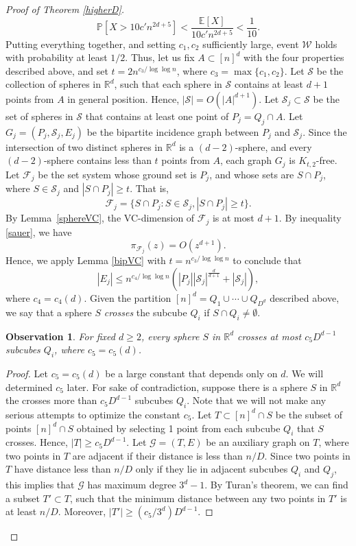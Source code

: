 \documentclass[11pt]{article}
\theoremstyle{plain}
\newtheorem{observation}[theorem]{Observation}
\theoremstyle{definition}
\theoremstyle{remark}
\begin{document}
\begin{proof}[Proof of Theorem \ref{higherD}]
%
%
$$\mathbb{P}[X> 10c'n^{2d + 5}] < \frac{\mathbb{E}[X]}{10c'n^{2d + 5}} < \frac{1}{10}.$$
%
 \noindent Putting everything together, and setting $c_1, c_2$ sufficiently large, event $\mathcal{W}$ holds with probability at least $1/2$.  
%
%
%
%
%
%
 Thus, let us fix $A\subset [n]^d$ with the four properties described above, and set $t = 2n^{c_3/\log\log n}$, where $c_3 = \max\{c_1,c_2\}$.  Let $\mathcal{S}$ be the collection of spheres in $\mathbb{R}^d$, such that each sphere in $\mathcal{S}$ contains at least $d+1$ points from $A$ in general position.  Hence, $|\mathcal{S}| = O(|A|^{d + 1})$. Let $\mathcal{S}_j \subset \mathcal{S}$ be the set of spheres in $\mathcal{S}$ that contains at least one point of $P_j  = Q_j\cap A$. Let $G_j = (P_j,\mathcal{S}_j,E_j)$ be the bipartite incidence graph between $P_j$ and $\mathcal{S}_j$.  Since the intersection of two distinct spheres in $\mathbb{R}^d$ is a $(d-2)$-sphere, and every $(d-2)$-sphere contains less than $t$ points from $A$, each graph $G_j$ is $K_{t,2}$-free. 
%
%
 Let $\mathcal{F}_{j}$ be the set system whose ground set is $P_{j}$, and whose sets are $S\cap P_{j}$, where $S \in \mathcal{S}_{j}$ and $|S\cap P_{j}| \geq t$.  That is, 
%
%
$$\mathcal{F}_{j} = \{S\cap P_{j}: S\in \mathcal{S}_{j}, |S\cap P_j| \geq t\}.$$
%
\noindent By Lemma~\ref{sphereVC}, the VC-dimension of $\mathcal{F}_j$ is at most $d+1$.  By inequality \eqref{sauer}, we have $$\pi_{\mathcal{F}_j}(z) = O(z^{d+1}).$$ Hence, we apply Lemma \ref{bipVC} with $t = n^{c_3/\log\log n}$ to conclude that  $$|E_j| \leq n^{c_4/\log\log n}\left(|P_j||\mathcal{S}_j|^{\frac{d}{d+1}} + |\mathcal{S}_j|\right),$$ where $c_4 = c_4(d)$.  
%
Given the partition $[n]^d = Q_1\cup \cdots \cup Q_{D^d}$ described above, we say that a sphere $S$ \emph{crosses} the subcube $Q_i$ if $S\cap Q_i\neq \emptyset$.  
%
\begin{observation}
For fixed $d \geq 2$, every sphere $S$ in $\mathbb{R}^d$ crosses at most $c_5D^{d-1}$ subcubes $Q_i$, where $c_5 = c_5(d)$.
\end{observation}
%
%
\begin{proof}
   Let $c_5 = c_5(d)$ be a large constant that depends only on $d$.  We will determined $c_5$ later.  For sake of contradiction, suppose there is a sphere $S$ in $\mathbb{R}^d$ the crosses more than $c_5D^{d-1}$ subcubes $Q_i$. Note that we will not make any serious attempts to optimize the constant $c_5$.
%
 Let $T \subset [n]^d\cap S$ be the subset of points $[n]^d\cap S$ obtained by selecting 1 point from each subcube $Q_i$ that $S$ crosses.  Hence, $|T| \geq c_5D^{d-1}.$ Let $\mathcal{G} = (T,E)$ be an auxiliary graph on $T$, where two points in $T$ are adjacent if their distance is less than $n/D$.  Since two points in $T$ have distance less than $n/D$ only if they lie in adjacent subcubes $Q_i$ and $Q_j$, this implies that $\mathcal{G}$ has maximum degree $3^d - 1$.  By Turan's theorem, we can find a subset $T'\subset T$, such that the minimum distance between any two points in $T'$ is at least $n/D$.  Moreover, $|T'| \geq (c_5/3^d)D^{d-1}$.  

\end{proof}
\end{proof}
\end{document}

